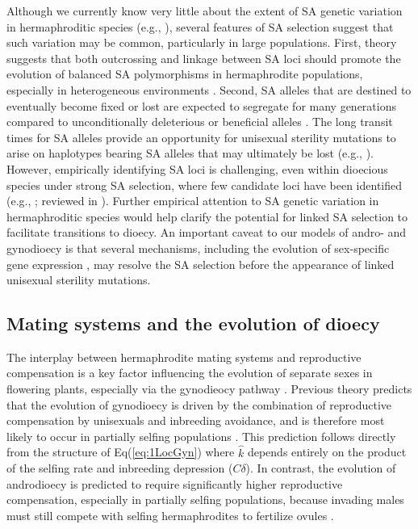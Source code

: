 \documentclass{article}
\begin{document}
Although we currently know very little about the extent of SA genetic variation in hermaphroditic species (e.g., \citealt{Abbott2011,Olito-etal-2018}), several features of SA selection suggest that such variation may be common, particularly in large populations. First, theory suggests that both outcrossing and linkage between SA loci should promote the evolution of balanced SA polymorphisms in hermaphrodite populations, especially in heterogeneous environments \citep{JordanConnallon2014, Olito2017, Olito-etal-2018}. Second, SA alleles that are destined to eventually become fixed or lost are expected to segregate for many generations compared to unconditionally deleterious or beneficial alleles \citep{ConnallonClark2012}. The long transit times for SA alleles provide an opportunity for unisexual sterility mutations to arise on haplotypes bearing SA alleles that may ultimately be lost (e.g., \citealt{WeinreichChao2005}). However, empirically identifying SA loci is challenging, even within dioecious species under strong SA selection, where few candidate loci have been identified (e.g., \citealt{Barson2015, LeeKelly2015}; reviewed in \citealt{ConnallonHall2018, Mank2017}). Further empirical attention to SA genetic variation in hermaphroditic species would help clarify the potential for linked SA selection to facilitate transitions to dioecy. An important caveat to our models of andro- and gynodioecy is that several mechanisms, including the evolution of sex-specific gene expression \citep{Vicoso2013}, may resolve the SA selection before the appearance of linked unisexual sterility mutations.


\subsection*{Mating systems and the evolution of dioecy}

The interplay between hermaphrodite mating systems and reproductive compensation is a key factor influencing the evolution of separate sexes in flowering plants, especially via the gynodieocy pathway \citep{Darwin1877,Charlesworth1978a}. Previous theory predicts that the evolution of gynodioecy is driven by the combination of reproductive compensation by unisexuals and inbreeding avoidance, and is therefore most likely to occur in partially selfing populations \citep{Lewis1942, Lloyd1975, Charlesworth1978a, KaferPannell2017}. This prediction follows directly from the structure of Eq(\ref{eq:1LocGyn}) where $\hat{k}$ depends entirely on the product of the selfing rate and inbreeding depression ($C \delta$). In contrast, the evolution of androdioecy is predicted to require significantly higher reproductive compensation, especially in partially selfing populations, because invading males must still compete with selfing hermaphrodites to fertilize ovules \citep{Charlesworth1978b, KaferPannell2017}. 
\end{document}
